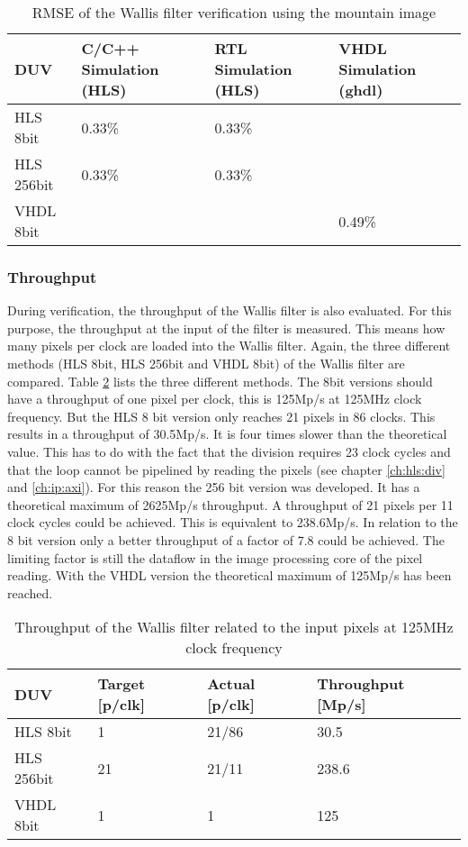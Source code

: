 \begin{table}[tb!]
    \centering
    \begin{tabular}{l l l l}
        \toprule
        DUV & C/C++ Simulation (HLS) & RTL Simulation (HLS) & VHDL Simulation (ghdl) \\
        \midrule
        HLS  8bit    & 0.33\%    & 0.33\%    & {} \\
        HLS  256bit  & 0.33\%    & 0.33\%    & {} \\
        VHDL 8bit        & {}         & {}         & 0.49\% \\
        \bottomrule
    \end{tabular}
    \caption{RMSE of the Wallis filter verification using the mountain image}
    \label{tab:rmse_mountain}
\end{table}

\subsubsection*{Throughput}
During verification, the throughput of the Wallis filter is also evaluated.
For this purpose, the throughput at the input of the filter is measured. This
means how many pixels per clock are loaded into the Wallis filter. Again, the
three different methods (HLS 8bit, HLS 256bit and VHDL 8bit) of the Wallis filter
are compared. Table \ref{tab:throughput} lists the three different methods. The
8bit versions should have a throughput of one pixel per clock, this is 125Mp/s
at 125MHz clock frequency. But the HLS 8 bit version only reaches 21 pixels in
86 clocks. This results in a throughput of 30.5Mp/s. It is four times slower
than the theoretical value. This has to do with the fact that the division
requires 23 clock cycles and that the loop cannot be pipelined by reading the
pixels (see chapter \ref{ch:hls:div} and \ref{ch:ip:axi}). For this reason the
256 bit version was developed. It has a theoretical maximum of 2625Mp/s
throughput. A throughput of 21 pixels per 11 clock cycles could be achieved.
This
is equivalent to 238.6Mp/s. In relation to the 8 bit version only a better
throughput of a factor of 7.8 could be achieved. The limiting factor is still
the dataflow in the image processing core of the pixel reading. With the VHDL version the theoretical maximum of 125Mp/s has been
reached.

\begin{table}[tb!]
    \centering
    \begin{tabular}{l l l l}
        \toprule
        DUV & Target [p/clk] & Actual [p/clk]  & Throughput [Mp/s]\\
        \midrule
        HLS  8bit    & 1     & 21/86     & 30.5\\
        HLS  256bit  & 21    & 21/11     & 238.6 \\
        VHDL 8bit        & 1     & 1         & 125 \\
        \bottomrule
    \end{tabular}
    \caption{Throughput of the Wallis filter related to the input pixels at
    125MHz clock frequency}
    \label{tab:throughput}
\end{table}



